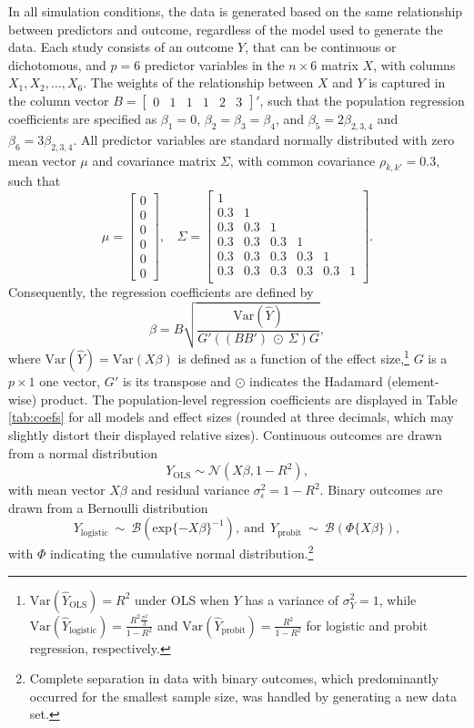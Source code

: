 \documentclass[review, 3p, authoryear]{elsarticle} %
\begin{document}
In all simulation conditions, the data is generated based on the same relationship between predictors and outcome, regardless of the model used to generate the data.
Each study consists of an outcome \(Y\), that can be continuous or dichotomous, and \(p = 6\) predictor variables in the \(n \times 6\) matrix \(X\), with columns \(X_1, X_2, \dots, X_6\).
The weights of the relationship between \(X\) and \(Y\) is captured in the column vector \(B = \begin{bmatrix} 0 & 1 & 1 & 1 & 2 & 3 \end{bmatrix}'\), such that the population regression coefficients are specified as \(\beta_1 = 0\), \(\beta_2 = \beta_3 = \beta_4\), and \(\beta_5 = 2\beta_{2,3,4}\) and \(\beta_6 = 3\beta_{2,3,4}\).
All predictor variables are standard normally distributed with zero mean vector \(\mu\) and covariance matrix \(\Sigma\), with common covariance \(\rho_{k,k'}=0.3\), such that
\[
\mu = 
\begin{bmatrix}
0 \\ 0 \\ 0 \\ 0 \\ 0 \\ 0
\end{bmatrix}, 
~~~~
\Sigma = 
\begin{bmatrix}
1 &  &  &  &  &  \\ 
0.3 & 1 &  &  &  &  \\ 
0.3 & 0.3 & 1 &  &  &  \\ 
0.3 & 0.3 & 0.3 & 1 &  &  \\ 
0.3 & 0.3 & 0.3 & 0.3 & 1 &  \\ 
0.3 & 0.3 & 0.3 & 0.3 & 0.3 & 1  \\ 
\end{bmatrix}.
\]
Consequently, the regression coefficients are defined by
\[
\beta = B 
  \sqrt{
    \frac{\text{Var}(\hat{Y})}{G'((BB')~\odot~\Sigma)G}
  },
\]
where \(\text{Var}(\hat{Y}) = \text{Var}(X\beta)\) is defined as a function of the effect size,\footnote{
  \(\text{Var}(\hat{Y}_{\text{OLS}}) = R^2\) under OLS when \(Y\) has a variance of \(\sigma_Y^2 = 1\), while \(\text{Var}(\hat{Y}_{\text{logistic}}) = \frac{R^2\frac{\pi^2}{3}}{1 - R^2}\) and \(\text{Var}(\hat{Y}_{\text{probit}}) = \frac{R^2}{1-R^2}\) for logistic and probit regression, respectively.}
\(G\) is a \(p \times 1\) one vector, \(G'\) is its transpose and \(\odot\) indicates the Hadamard (element-wise) product.
The population-level regression coefficients are displayed in Table \ref{tab:coefs} for all models and effect sizes (rounded at three decimals, which may slightly distort their displayed relative sizes).
Continuous outcomes are drawn from a normal distribution
\[
Y_{\text{OLS}} \sim \mathcal{N}(X\beta, 1 - R^2),
\]
with mean vector \(X\beta\) and residual variance \(\sigma_{\epsilon}^2=1-R^2\).
Binary outcomes are drawn from a Bernoulli distribution
\[
Y_{\text{logistic}} ~ \sim ~ \mathcal{B}(\text{exp}\{-X\beta\}^{-1}), 
~ \text{and} ~~
Y_{\text{probit}} ~ \sim ~ \mathcal{B}(\Phi\{X\beta\}),
\]
with \(\Phi\) indicating the cumulative normal distribution.\footnote{Complete separation in data with binary outcomes, which predominantly occurred for the smallest sample size, was handled by generating a new data set.}
\end{document}
